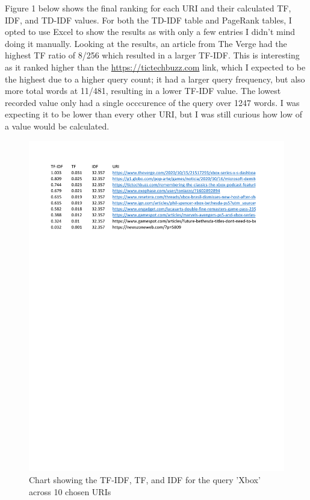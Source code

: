 \documentclass[12pt]{article}
\begin{document}


Figure 1 below shows the final ranking for each URI and their calculated TF, IDF, and TD-IDF values. For both the TD-IDF table and PageRank tables, I opted to use Excel to show the results as with only a few entries I didn't mind doing it manually. Looking at the results, an article from The Verge had the highest TF ratio of 8/256 which resulted in a larger TF-IDF. This is interesting as it ranked higher than the \url{https://tictechbuzz.com} link, which I expected to be the highest due to a higher query count; it had a larger query frequency, but also more total words at 11/481, resulting in a lower TF-IDF value. The lowest recorded value only had a single occcurence of the query over 1247 words. I was expecting it to be lower than every other URI, but I was still curious how low of a value would be calculated.  

\begin{figure}[H]
            \centering
            \includegraphics[trim = 0 20cm {0.31\textwidth} 2cm, clip]{TF_IDF_Table.pdf}
            \caption{Chart showing the TF-IDF, TF, and IDF for the query 'Xbox' across 10 chosen URIs}
            \label{fig:my_label}
        \end{figure}
\end{document}
